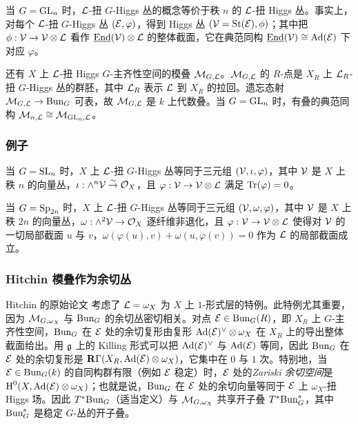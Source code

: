 当 $G=\textup{GL}_{n}$ 时，$\mathcal{L}$-扭 $G$-Higgs 丛的概念等价于秩 $n$ 的 $\mathcal{L}$-扭 Higgs 丛。事实上，对每个 $\mathcal{L}$-扭 $G$-Higgs 丛 $(\mathcal{E},\varphi)$，得到 Higgs 丛 $(\mathcal{V}=\textup{St}(\mathcal{E}),\phi)$；其中把 $\phi:\mathcal{V}\to\mathcal{V}\otimes\mathcal{L}$ 看作 $\underline{\textup{End}}(\mathcal{V})\otimes\mathcal{L}$ 的整体截面，它在典范同构 $\underline{\textup{End}}(\mathcal{V})\cong\textup{Ad}(\mathcal{E})$ 下对应 $\varphi$。

还有 $X$ 上 $\mathcal{L}$-扭 Higgs $G$-主齐性空间的模叠 $\mathcal{M}_{G,\mathcal{L}}$。$\mathcal{M}_{G,\mathcal{L}}$ 的 $R$-点是 $X_{R}$ 上 $\mathcal{L}_{R}$-扭 $G$-Higgs 丛的群胚，其中 $\mathcal{L}_{R}$ 表示 $\mathcal{L}$ 到 $X_{R}$ 的拉回。遗忘态射 $\mathcal{M}_{G,\mathcal{L}}\to \textup{Bun}_{G}$ 可表，故 $\mathcal{M}_{G,\mathcal{L}}$ 是 $k$ 上代数叠。当 $G=\textup{GL}_{n}$ 时，有叠的典范同构 $\mathcal{M}_{n,\mathcal{L}}\cong\mathcal{M}_{\textup{GL}_{n},\mathcal{L}}$。

\subsubsection{例子} 当 $G=\textup{SL}_{n}$ 时，$X$ 上 $\mathcal{L}$-扭 $G$-Higgs 丛等同于三元组 $(\mathcal{V},\iota,\varphi)$，其中 $\mathcal{V}$ 是 $X$ 上秩 $n$ 的向量丛，$\iota:\wedge^{n}\mathcal{V}\stackrel{\sim}{\to}\mathcal{O}_{X}$，且 $\varphi: \mathcal{V}\to\mathcal{V}\otimes\mathcal{L}$ 满足 $\textup{Tr}(\varphi)=0$。

当 $G=\textup{Sp}_{2n}$ 时，$X$ 上 $\mathcal{L}$-扭 $G$-Higgs 丛等同于三元组 $(\mathcal{V},\omega,\varphi)$，其中 $\mathcal{V}$ 是 $X$ 上秩 $2n$ 的向量丛，$\omega:\wedge^{2}\mathcal{V}\to\mathcal{O}_{X}$ 逐纤维非退化，且 $\varphi: \mathcal{V}\to\mathcal{V}\otimes\mathcal{L}$ 使得对 $\mathcal{V}$ 的一切局部截面 $u$ 与 $v$，$\omega(\varphi(u),v)+\omega(u,\varphi(v))=0$ 作为 $\mathcal{L}$ 的局部截面成立。

\subsubsection{Hitchin 模叠作为余切丛}
Hitchin 的原始论文 \cite{Hi} 考虑了 $\mathcal{L}=\omega_{X}$ 为 $X$ 上 $1$-形式层的特例。此特例尤其重要，因为 $\mathcal{M}_{G,\omega_{X}}$ 与 $\textup{Bun}_{G}$ 的余切丛密切相关。对点 $\mathcal{E}\in\textup{Bun}_{G}(R)$，即 $X_{R}$ 上 $G$-主齐性空间，$\textup{Bun}_{G}$ 在 $\mathcal{E}$ 处的余切复形由复形 $\textup{Ad}(\mathcal{E})^{\vee}\otimes\omega_{X}$ 在 $X_{R}$ 上的导出整体截面给出。用 $\mathfrak{g}$ 上的 Killing 形式可以把 $\textup{Ad}(\mathcal{E})^{\vee}$ 与 $\textup{Ad}(\mathcal{E})$ 等同，因此 $\textup{Bun}_{G}$ 在 $\mathcal{E}$ 处的余切复形是 $\mathbf{R}\Gamma(X_{R}, \textup{Ad}(\mathcal{E})\otimes\omega_{X})$，它集中在 $0$ 与 $1$ 次。特别地，当 $\mathcal{E}\in \textup{Bun}_{G}(k)$ 的自同构群有限（例如 $\mathcal{E}$ 稳定）时，$\mathcal{E}$ 处的{\em Zariski 余切空间}是 $\textup{H}^{0}({X,\textup{Ad}(\mathcal{E})\otimes\omega_{X}})$；也就是说，$\textup{Bun}_{G}$ 在 $\mathcal{E}$ 处的余切向量等同于 $\mathcal{E}$ 上 $\omega_{X}$-扭 Higgs 场。因此 $T^{*}\textup{Bun}_{G}$（适当定义）与 $\mathcal{M}_{G,\omega_{X}}$ 共享开子叠 $T^{*}\textup{Bun}^{s}_{G}$，其中 $\textup{Bun}^{s}_{G}$ 是稳定 $G$-丛的开子叠。

